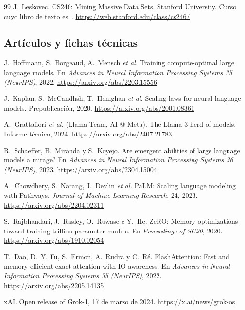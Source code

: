 \begin{thebibliography}{99}
J.~Leskovec.
\newblock CS246: Mining Massive Data Sets.
\newblock Stanford University. Curso cuyo libro de texto es~\cite{mmds}.
\newblock \url{https://web.stanford.edu/class/cs246/}

\subsection*{Artículos y fichas técnicas}

J.~Hoffmann, S.~Borgeaud, A.~Mensch \emph{et al.}
\newblock Training compute-optimal large language models.
\newblock En \emph{Advances in Neural Information Processing Systems 35 (NeurIPS)}, 2022.
\newblock \url{https://arxiv.org/abs/2203.15556}

J.~Kaplan, S.~McCandlish, T.~Henighan \emph{et al.}
\newblock Scaling laws for neural language models.
\newblock Prepublicación, 2020.
\newblock \url{https://arxiv.org/abs/2001.08361}

A.~Grattafiori \emph{et al.} (Llama Team, AI @ Meta).
\newblock The Llama 3 herd of models.
\newblock Informe técnico, 2024.
\newblock \url{https://arxiv.org/abs/2407.21783}

R.~Schaeffer, B.~Miranda y S.~Koyejo.
\newblock Are emergent abilities of large language models a mirage?
\newblock En \emph{Advances in Neural Information Processing Systems 36 (NeurIPS)}, 2023.
\newblock \url{https://arxiv.org/abs/2304.15004}

A.~Chowdhery, S.~Narang, J.~Devlin \emph{et al.}
\newblock PaLM: Scaling language modeling with Pathways.
\newblock \emph{Journal of Machine Learning Research}, 24, 2023.
\newblock \url{https://arxiv.org/abs/2204.02311}

S.~Rajbhandari, J.~Rasley, O.~Ruwase e Y.~He.
\newblock ZeRO: Memory optimizations toward training trillion parameter models.
\newblock En \emph{Proceedings of SC20}, 2020.
\newblock \url{https://arxiv.org/abs/1910.02054}

T.~Dao, D.~Y. Fu, S.~Ermon, A.~Rudra y C.~Ré.
\newblock FlashAttention: Fast and memory-efficient exact attention with IO-awareness.
\newblock En \emph{Advances in Neural Information Processing Systems 35 (NeurIPS)}, 2022.
\newblock \url{https://arxiv.org/abs/2205.14135}

xAI.
\newblock Open release of Grok-1, 17 de marzo de 2024.
\newblock \url{https://x.ai/news/grok-os}


\end{thebibliography}
